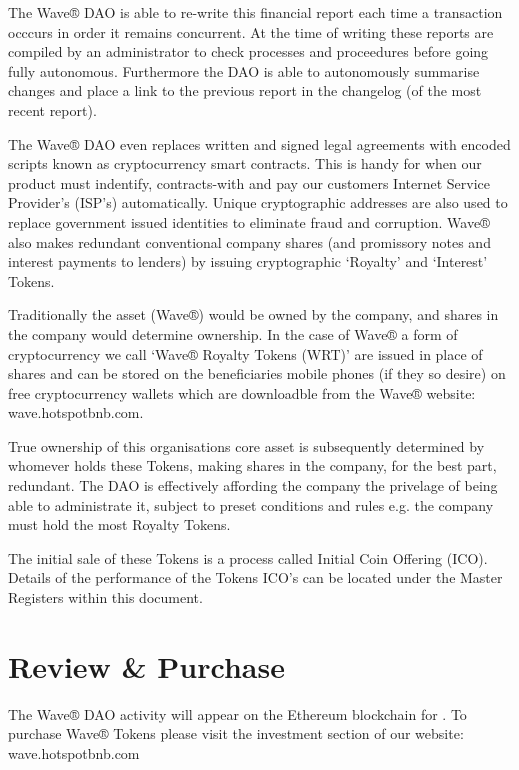 \documentclass[letterpaper,10pt,openany,oneside,english]{sphinxmanual}
\begin{document}
\noindent{}

The Wave® DAO is able to re-write this financial report each time a transaction occcurs in order it remains concurrent.
At the time of writing these reports are compiled by an administrator to check processes and proceedures before going fully autonomous.
Furthermore the DAO is able to autonomously summarise changes and place a link to the previous report in the changelog (of the most recent report).

The Wave® DAO even replaces written and signed legal agreements with encoded scripts known as cryptocurrency smart contracts.
This is handy for when our product must indentify, contracts-with and pay our customers Internet Service Provider’s (ISP’s) automatically.
Unique cryptographic addresses are also used to replace government issued identities to eliminate fraud and corruption.
Wave® also makes redundant conventional company shares (and promissory notes and interest payments to lenders) by issuing cryptographic ‘Royalty’ and ‘Interest’ Tokens.

Traditionally the asset (Wave®) would be owned by the company, and shares in the company would determine ownership.
In the case of Wave® a form of cryptocurrency we call ‘Wave® Royalty Tokens (WRT)’ are issued in place of shares and can be stored on the beneficiaries mobile phones (if they so desire) on free cryptocurrency wallets which are downloadble from the Wave®  website: wave.hotspotbnb.com.

True ownership of this organisations core asset is subsequently determined by whomever holds these Tokens, making shares in the company, for the best part, redundant.
The DAO is effectively affording the company the privelage of being able to administrate it, subject to preset conditions and rules e.g. the company must hold the most Royalty Tokens.

The initial sale of these Tokens is a process called Initial Coin Offering (ICO).
Details of the performance of the Tokens ICO’s can be located under the Master Registers within this document.


\section{Review \& Purchase}
\label{\detokenize{introduction:review-purchase}}
The Wave® DAO activity will appear on the Ethereum blockchain for .
To purchase Wave® Tokens please visit the investment section of our website: wave.hotspotbnb.com
\end{document}
